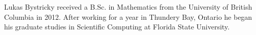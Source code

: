 \documentclass[11pt,expanded,copyright]{fsuthesis}
\begin{document}


\renewcommand*{\bibname}{References}



\begin{biosketch}
	Lukas Bystricky received a B.Sc. in Mathematics from the University of British Columbia in 2012. After working for a year in Thundery Bay, Ontario he began his graduate studies in Scientific Computing at Florida State University. 
\end{biosketch}
\end{document}
